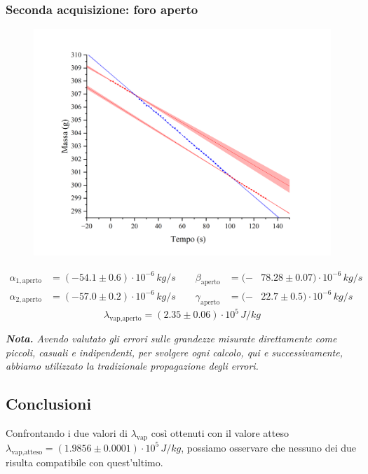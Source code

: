 \documentclass{article}
\begin{document}
\subsubsection{Seconda acquisizione: foro aperto}
\begin{figure}[H]
  \includegraphics[trim={2.5cm 0.6cm 3cm 1cm},clip,width=\textwidth]{img/g_azoto3.png}
\end{figure}
\[\begin{aligned}
  \alpha_{1,\text{aperto}} &= (-54.1\pm0.6)\cdot10^{-6}\,\unit{kg\per s}
  \qquad
  \beta_{\text{aperto}}\!\!\!\!&=(-&78.28\pm0.07)\cdot10^{-6}\,\unit{kg\per s}
  \\
  \alpha_{2,\text{aperto}} &= (-57.0\pm0.2)\cdot10^{-6}\,\unit{kg\per s}
  \qquad
  \gamma_\text{aperto}\!\!\!\!&=(-&22.7\pm0.5)\cdot10^{-6}\,\unit{kg\per s}
\end{aligned}\]
\[
  \lambda_\text{vap,aperto} = (2.35\pm0.06)\cdot10^5\,\unit{J \per kg}
\]

\vspace{5mm}
\emph{
  \textbf{Nota.}
  Avendo valutato gli errori sulle grandezze misurate direttamente
  come piccoli, casuali e indipendenti, per svolgere ogni calcolo,
  qui e successivamente, abbiamo utilizzato la tradizionale
  propagazione degli errori.
}

\subsection{Conclusioni}
Confrontando i due valori di $\lambda_\text{vap}$ così ottenuti
con il valore atteso $\lambda_\text{vap,atteso} =
(1.9856\pm0.0001)\cdot10^5\,\unit{J\per kg}$,
possiamo osservare che nessuno dei due risulta compatibile con
quest'ultimo.
\end{document}

